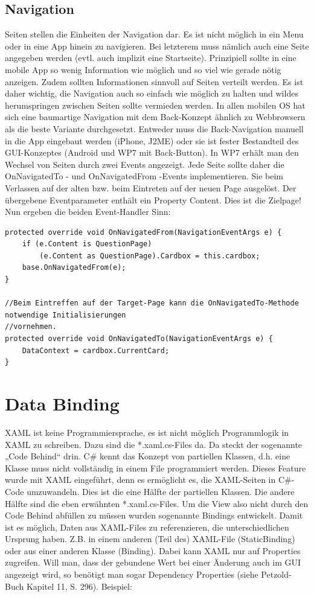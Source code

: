 \documentclass[a4paper,10pt]{scrreprt}
\begin{document}
\subsection{Navigation}
Seiten stellen die Einheiten der Navigation dar. Es ist nicht möglich in ein Menu oder in eine App hinein zu
navigieren. Bei letzterem muss nämlich auch eine Seite angegeben werden (evtl. auch implizit eine Startseite).
Prinzipiell sollte in eine mobile App so wenig Information wie möglich und so viel wie gerade nötig anzeigen.
Zudem sollten Informationen sinnvoll auf Seiten verteilt werden. Es ist daher wichtig, die Navigation auch so
einfach wie möglich zu halten und wildes herumspringen zwischen Seiten sollte vermieden werden.
In allen mobilen OS hat sich eine baumartige Navigation mit dem Back-Konzept ähnlich zu Webbrowsern als die
beste Variante durchgesetzt. Entweder muss die Back-Navigation manuell in die App eingebaut werden (iPhone,
J2ME) oder sie ist fester Bestandteil des GUI-Konzeptes (Android und WP7 mit Back-Button).
In WP7 erhält man den Wechsel von Seiten durch zwei Events angezeigt. Jede Seite sollte daher die
OnNavigatedTo - und OnNavigatedFrom -Events implementieren. Sie beim Verlassen auf der alten bzw. beim
Eintreten auf der neuen Page ausgelöst. Der übergebene Eventparameter enthält ein Property Content. Dies ist
die Zielpage! Nun ergeben die beiden Event-Handler Sinn:

\begin{lstlisting}[caption=Navigation]
protected override void OnNavigatedFrom(NavigationEventArgs e) {
	if (e.Content is QuestionPage)
		(e.Content as QuestionPage).Cardbox = this.cardbox;
	base.OnNavigatedFrom(e);
}

//Beim Eintreffen auf der Target-Page kann die OnNavigatedTo-Methode notwendige Initialisierungen
//vornehmen.
protected override void OnNavigatedTo(NavigationEventArgs e) {
	DataContext = cardbox.CurrentCard;
}

\end{lstlisting}

\section{Data Binding}
XAML ist keine Programmiersprache, es ist nicht möglich Programmlogik in XAML zu schreiben. Dazu sind die
*.xaml.cs-Files da. Da steckt der sogenannte „Code Behind“ drin. C\# kennt das Konzept von partiellen Klassen,
d.h. eine Klasse muss nicht vollständig in einem File programmiert werden. Dieses Feature wurde mit XAML
eingeführt, denn es ermöglicht es, die XAML-Seiten in C\#-Code umzuwandeln. Dies ist die eine Hälfte der
partiellen Klassen. Die andere Hälfte sind die eben erwähnten *.xaml.cs-Files.
Um die View also nicht durch den Code Behind abfüllen zu müssen wurden sogenannte Bindings entwickelt.
Damit ist es möglich, Daten aus XAML-Files zu referenzieren, die unterschiedlichen Ursprung haben. Z.B. in
einem anderen (Teil des) XAML-File (StaticBinding) oder aus einer anderen Klasse (Binding). Dabei kann XAML
nur auf Properties zugreifen. Will man, dass der gebundene Wert bei einer Änderung auch im GUI angezeigt
wird, so benötigt man sogar Dependency Properties (siehe Petzold-Buch Kapitel 11, S. 296). Beispiel:
\end{document}
